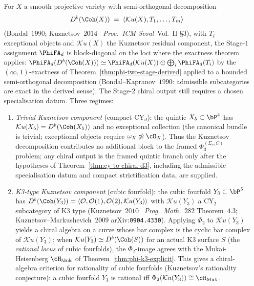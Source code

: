 \begin{remark}
\label{rem:phi-d-kuznetsov}
For $X$ a smooth projective variety with semi-orthogonal decomposition
\[
 D^b(\Coh(X)) \;=\; \langle \mathcal K u(X), T_1, \ldots, T_m \rangle
\]
(Bondal~$1990$; Kuznetsov~$2014$~\cite{Kuznetsov2014} \textit{Proc.~ICM Seoul}~Vol.~II §$3$), with $T_i$ exceptional objects and $\mathcal K u(X)$ the Kuznetsov residual component, the Stage-$1$ assignment $\PhiFA_d$ is block-diagonal on the loci where the exactness theorem applies:
$\PhiFA_d(D^b(\Coh(X))) \simeq \PhiFA_d(\mathcal K u(X)) \oplus \bigoplus_i \PhiFA_d(T_i)$ by the $(\infty,1)$-exactness of Theorem~\ref{thm:phi-two-stage-derived} applied to a bounded semi-orthogonal decomposition (Bondal--Kapranov~$1990$: admissible subcategories are exact in the derived sense). The Stage-$2$ chiral output still requires a chosen specialisation datum. Three regimes:
\begin{enumerate}[label=\textup{(\roman*)}]
 \item \emph{Trivial Kuznetsov component} (compact CY$_d$): the quintic $X_5 \subset \bP^4$ has $\mathcal K u(X_5) = D^b(\Coh(X_5))$ and no exceptional collection (the canonical bundle is trivial; exceptional objects require $\omega_X \not\simeq \cO_X$). Thus the Kuznetsov decomposition contributes no additional block to the framed $\Phi_3^{(\Sigma_2,C)}$ problem; any chiral output is the framed quintic branch only after the hypotheses of Theorem~\ref{thm:cy-to-chiral-d3}, including the admissible specialisation datum and compact strictification data, are supplied.
 \item \emph{K3-type Kuznetsov component} (cubic fourfold): the cubic fourfold $Y_3 \subset \bP^5$ has $D^b(\Coh(Y_3)) = \langle \mathcal O, \mathcal O(1), \mathcal O(2), \mathcal K u(Y_3) \rangle$ with $\mathcal K u(Y_3)$ a CY$_2$ subcategory of K$3$ type (Kuznetsov~$2010$~\cite{Kuznetsov2010} \textit{Prog.~Math.}~$282$ Theorem~$4.3$; Kuznetsov--Markushevich~$2009$ arXiv:\texttt{0904.4330}). Applying $\Phi_2$ to $\mathcal K u(Y_3)$ yields a chiral algebra on a curve whose bar complex is the cyclic bar complex of $\mathcal K u(Y_3)$; when $\mathcal K u(Y_3) \simeq D^b(\Coh(S))$ for an actual K$3$ surface $S$ (the \emph{rational locus} of cubic fourfolds), the $\Phi_2$-image agrees with the Mukai-Heisenberg $\cH_{\mathrm{Muk}}$ of Theorem~\ref{thm:phi-k3-explicit}. This gives a chiral-algebra criterion for rationality of cubic fourfolds (Kuznetsov's rationality conjecture): a cubic fourfold $Y_3$ is rational iff $\Phi_2(\mathcal K u(Y_3)) \cong \cH_{\mathrm{Muk}}$.

\end{enumerate}
\end{remark}

